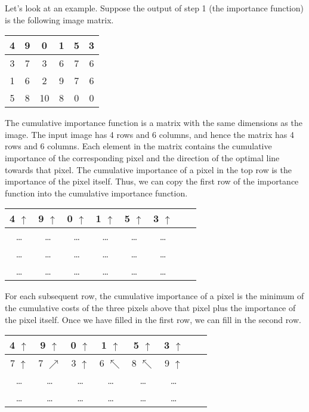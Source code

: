 \documentclass{article}
\begin{document}
Let's look at an example. Suppose the output of step 1 (the importance function) is the following image matrix.
\renewcommand\arraystretch{1.6}
\begin{center}
\begin{tabular}{| c | c | c | c | c | c |}
\hline
4 & 9 & 0 & 1 & 5 & 3\\
\hline
3 & 7 & 3 & 6 & 7 & 6\\
\hline
1 & 6 & 2 & 9 & 7 & 6\\
\hline
5 & 8 & 10 & 8 & 0 & 0\\
\hline
\end{tabular}
\end{center}
The cumulative importance function is a matrix with the same dimensions as the image. The input image has 4 rows and 6 columns, and hence the matrix has 4 rows and 6 columns. Each element in the matrix contains the cumulative importance of the corresponding pixel and the direction of the optimal line towards that pixel. The cumulative importance of a pixel in the top row is the importance of the pixel itself. Thus, we can copy the first row of the importance function into the cumulative importance function.
\begin{center}
\begin{tabular}{| c | c | c | c | c | c | c | c |}
\hline
4 $\uparrow$ & 9 $\uparrow$ & 0 $\uparrow$ & 1 $\uparrow$ & 5 $\uparrow$ & 3 $\uparrow$\\
\hline
\dots & \dots  & \dots  & \dots  & \dots  & \dots \\
\hline
\dots  & \dots  & \dots  & \dots  & \dots  & \dots \\
\hline
\dots  & \dots  & \dots  & \dots  & \dots  & \dots \\
\hline
\end{tabular}
\end{center}
For each subsequent row, the cumulative importance of a pixel is the minimum of the cumulative costs of the three pixels above that pixel plus the importance of the pixel itself. Once we have filled in the first row, we can fill in the second row.
\begin{center}
\begin{tabular}{| c | c | c | c | c | c | c | c |}
\hline
4 $\uparrow$ & 9 $\uparrow$ & 0 $\uparrow$ & 1 $\uparrow$ & 5 $\uparrow$ & 3 $\uparrow$\\
\hline
7 $\uparrow$ & 7 $\nearrow$   & 3 $\uparrow$  & 6 $\nwarrow$  & 8 $\nwarrow$  & 9 $\uparrow$\\
\hline
\dots  & \dots  & \dots  & \dots  & \dots  & \dots \\
\hline
\dots  & \dots  & \dots  & \dots  & \dots  & \dots \\
\hline
\end{tabular}
\end{center}
\end{document}
